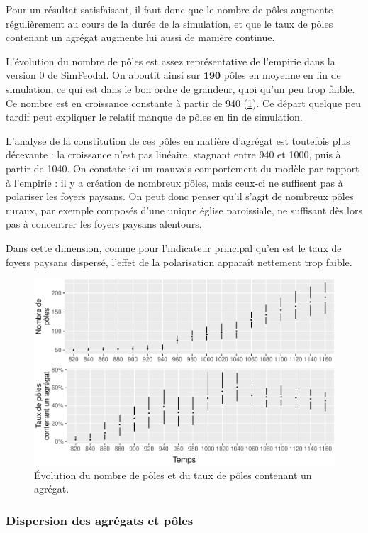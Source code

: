 Pour un résultat satisfaisant, il faut donc que le nombre de pôles augmente régulièrement au cours de la durée de la simulation, et que le taux de pôles contenant un agrégat augmente lui aussi de manière continue.

\begin{mdframed}[backgroundcolor=gray!10,footnoteinside=false]
L'évolution du nombre de pôles est assez représentative de l'empirie dans la version 0 de SimFeodal.
On aboutit ainsi sur $\textbf{190}$ pôles en moyenne en fin de simulation, ce qui est dans le bon ordre de grandeur, quoi qu'un peu trop faible.
Ce nombre est en croissance constante à partir de 940 (\cref{fig:nombre-poles-v0}).
Ce départ quelque peu tardif peut expliquer le relatif manque de pôles en fin de simulation.

L'analyse de la constitution de ces pôles en matière d'agrégat est toutefois plus décevante :
la croissance n'est pas linéaire, stagnant entre 940 et 1000, puis à partir de 1040.
On constate ici un mauvais comportement du modèle par rapport à l'empirie :
il y a création de nombreux pôles, mais ceux-ci ne suffisent pas à polariser les foyers paysans.
On peut donc penser qu'il s'agit de nombreux pôles ruraux, par exemple composés d'une unique église paroissiale, ne suffisant dès lors pas à concentrer les foyers paysans alentours.

Dans cette dimension, comme pour l'indicateur principal qu'en est le taux de foyers paysans dispersé, l'effet de la polarisation apparaît nettement trop faible.
\end{mdframed}


\begin{figure}[H]
\captionsetup{width=\linewidth}
\includegraphics[width=0.5\linewidth]{img/resultats/v0_nombre_poles.pdf}
\caption{Évolution du nombre de pôles et du taux de pôles contenant un agrégat.}
\label{fig:nombre-poles-v0}
\end{figure}

\clearpage

\subsubsection{Dispersion des agrégats et pôles}\label{par:polarisation-dispersion}

